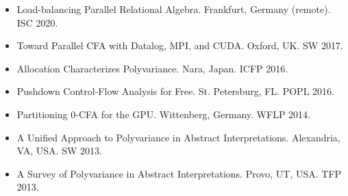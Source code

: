 \begin{itemize}
\itemsep=0.1cm
\item Load-balancing Parallel Relational Algebra. Frankfurt, Germany (remote). ISC 2020.
\item Toward Parallel CFA with Datalog, MPI, and CUDA. Oxford, UK. SW 2017.
\item Allocation Characterizes Polyvariance. Nara, Japan. ICFP 2016.
\item Pushdown Control-Flow Analysis for Free. St. Petersburg, FL. POPL 2016.
\item Partitioning 0-CFA for the GPU. Wittenberg, Germany. WFLP 2014.
\item A Unified Approach to Polyvariance in Abstract Interpretations. Alexandria, VA, USA. SW 2013.
\item A Survey of Polyvariance in Abstract Interpretations. Provo, UT, USA. TFP 2013.
\end{itemize}
